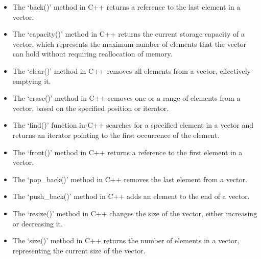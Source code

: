 \begin{itemize}
    \item {} The `back()' method in C++ returns a reference to the last element in a vector.
    \item {} The `capacity()' method in C++ returns the current storage capacity of a vector, which represents the maximum number of elements that the vector can hold without requiring reallocation of memory.
    \item {} The `clear()' method in C++ removes all elements from a vector, effectively emptying it.
    \item {} The `erase()' method in C++ removes one or a range of elements from a vector, based on the specified position or iterator.
    \item {} The `find()' function in C++ searches for a specified element in a vector and returns an iterator pointing to the first occurrence of the element. 
    \item {} The `front()' method in C++ returns a reference to the first element in a vector.
    \item {} The `pop\_back()' method in C++ removes the last element from a vector. 
    \item {} The `push\_back()' method in C++ adds an element to the end of a vector.
    \item {} The `resize()' method in C++ changes the size of the vector, either increasing or decreasing it.
    \item {} The `size()' method in C++ returns the number of elements in a vector, representing the current size of the vector.
\end{itemize}

\clearpage